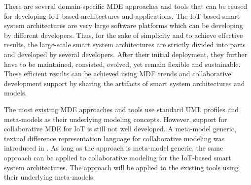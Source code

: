 There are several domain-specific MDE approaches and tools that can be reused for developing IoT-based architectures and applications. The IoT-based smart system architectures are very large software platforms which can be developing by different developers. Thus, for the sake of simplicity and to achieve effective results, the large-scale smart system architectures are strictly divided into parts and developed by several developers. After their initial deployment, they further have to be maintained, consisted, evolved, yet remain flexible and sustainable. These efficient results can be achieved using MDE trends and collaborative development support by sharing the artifacts of smart system architectures and models. 

The most existing MDE approaches and tools use standard UML profiles and meta-models as their underlying modeling concepts. However, support for collaborative MDE for IoT is still not well developed. A meta-model generic, textual difference representation language for collaborative modeling was introduced in \cite{Kuryazov+2018}. As long as the approach is meta-model generic, the same approach can be applied to collaborative modeling for the IoT-based smart system architectures. The approach will be applied to the existing tools using their underlying meta-models.

